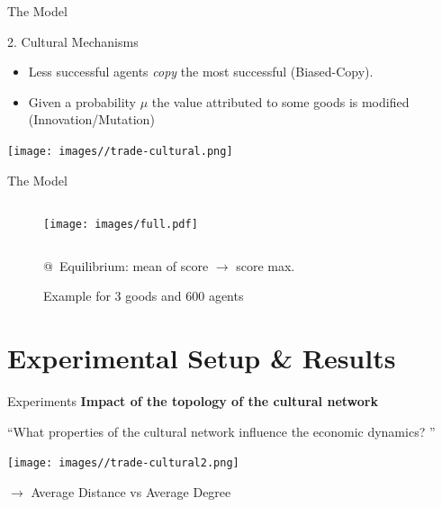 \documentclass[12pt, notes=show]{beamer}
\begin{document}
	\begin{frame}{The Model}
		\begin{block}{2. Cultural Mechanisms}
			\begin{itemize}
					\vfill
				\item Less successful agents \emph{copy} the most successful (Biased-Copy).
					\vfill
				\item Given a probability $\mu$ the value attributed to some goods is modified (Innovation/Mutation)
			\end{itemize}
		\end{block}
	\end{frame}

	\begin{frame}
		\begin{center}
			\texttt{[image: images//trade-cultural.png]}
		\end{center}
	\end{frame}

	\begin{frame}{The Model }
		\begin{figure}
			\caption{Example for 3 goods and 600 agents}
			\begin{columns}
				\texttt{[image: images/full.pdf]} 
			\end{columns}
			@~Equilibrium: mean of score  $\rightarrow$ score max.
		\end{figure}

	\end{frame}

	\section{Experimental Setup \& Results}
	\begin{frame}{Experiments}
		\textbf{Impact of the topology of the cultural network }
		\begin{center}
			``What properties of the cultural network influence the economic dynamics? '' 
		\end{center}
		\begin{center}
		\texttt{[image: images//trade-cultural2.png]}
		\end{center}
		\vfil
		$\rightarrow$ Average Distance vs Average Degree\\




	\end{frame}
\end{document}
